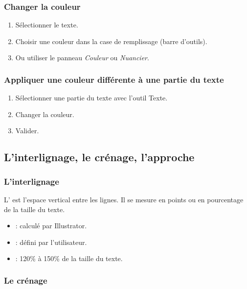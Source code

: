 \subsubsection{Changer la couleur}

\begin{enumerate}
    \item Sélectionner le texte.
    \item Choisir une couleur dans la case de remplissage (barre d'outils).
    \item Ou utiliser le panneau \emph{Couleur} ou \emph{Nuancier}.
\end{enumerate}

\subsubsection{Appliquer une couleur différente à une partie du texte}

\begin{enumerate}
    \item Sélectionner une partie du texte avec l'outil Texte.
    \item Changer la couleur.
    \item Valider.
\end{enumerate}

\subsection{L'interlignage, le crénage, l'approche}

\subsubsection{L'interlignage}

L' est l'espace vertical entre les lignes. Il se mesure en points ou en pourcentage de la taille du texte.

\begin{itemize}
    \item {} : calculé par Illustrator.
    \item {} : défini par l'utilisateur.
    \item {} : 120\% à 150\% de la taille du texte.
\end{itemize}

\subsubsection{Le crénage}

